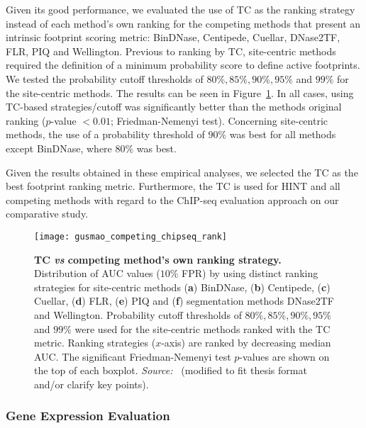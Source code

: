 Given its good performance, we evaluated the use of TC as the ranking strategy instead of each method's own ranking for the competing methods that present an intrinsic footprint scoring metric: BinDNase, Centipede, Cuellar, DNase2TF, FLR, PIQ and Wellington. Previous to ranking by TC, site-centric methods required the definition of a minimum probability score to define active footprints. We tested the probability cutoff thresholds of $80\%, 85\%, 90\%, 95\% $ and $99\%$ for the site-centric methods. The results can be seen in Figure~\ref{fig:gusmao_competing_chipseq_rank}. In all cases, using TC-based strategies/cutoff was significantly better than the methods original ranking ($p$-value $< 0.01$; Friedman-Nemenyi test). Concerning site-centric methods, the use of a probability threshold of $90\%$ was best for all methods except BinDNase, where $80\%$ was best.

Given the results obtained in these empirical analyses, we selected the TC as the best footprint ranking metric. Furthermore, the TC is used for HINT and all competing methods with regard to the ChIP-seq evaluation approach on our comparative study.

\begin{figure}[h!]
\centering
\texttt{[image: gusmao\_competing\_chipseq\_rank]}
\caption[TC \emph{vs} competing method's own ranking strategy]{\textbf{TC \emph{vs} competing method's own ranking strategy.} Distribution of AUC values ($10\%$ FPR) by using distinct ranking strategies for site-centric methods (\textbf{a}) BinDNase, (\textbf{b}) Centipede, (\textbf{c}) Cuellar, (\textbf{d}) FLR, (\textbf{e}) PIQ and (\textbf{f}) segmentation methods DNase2TF and Wellington. Probability cutoff thresholds of $80\%, 85\%, 90\%, 95\% $ and $99\%$ were used for the site-centric methods ranked with the TC metric. Ranking strategies ($x$-axis) are ranked by decreasing median AUC. The significant Friedman-Nemenyi test $p$-values are shown on the top of each boxplot. \emph{Source:~\cite{gusmao2016}} (modified to fit thesis format and/or clarify key points).}
\label{fig:gusmao_competing_chipseq_rank}
\end{figure}

\subsubsection{Gene Expression Evaluation}

